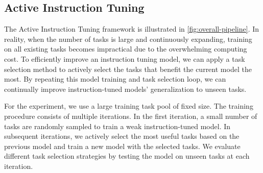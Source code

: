 \subsection{Active Instruction Tuning} The Active Instruction Tuning framework is illustrated in \autoref{fig:overall-pipeline}. In reality, when the number of tasks is large and continuously expanding, training on all existing tasks becomes impractical due to the overwhelming computing cost.
To efficiently improve an instruction tuning model, we can apply a task selection method to actively select the tasks that benefit the current model the most.
By repeating this model training and task selection loop, we can continually improve instruction-tuned models' generalization to unseen tasks.

For the experiment, we use a large training task pool of fixed size. The training procedure consists of multiple iterations. In the first iteration, a small number of tasks are randomly sampled to train a weak instruction-tuned model. In subsequent iterations, we actively select the most useful tasks based on the previous model and train a new model with the selected tasks. We evaluate different task selection strategies by testing the model on unseen tasks at each iteration.


